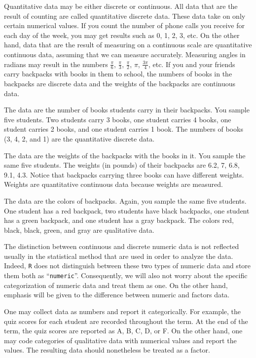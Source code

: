\documentclass[]{krantz}
\theoremstyle{definition}
\theoremstyle{definition}
\theoremstyle{definition}
\theoremstyle{remark}
\begin{document}
Quantitative data may be either discrete or continuous. All data that
are the result of counting are called quantitative discrete data. These
data take on only certain numerical values. If you count the number of
phone calls you receive for each day of the week, you may get results
such as 0, 1, 2, 3, etc. On the other hand, data that are the result of
measuring on a continuous scale are quantitative continuous data,
assuming that we can measure accurately. Measuring angles in radians may
result in the numbers \(\frac{\pi}{6}\), \(\frac{\pi}{3}\),
\(\frac{\pi}{2}\), \(\pi\), \(\frac{3\pi}{4}\), etc. If you and your
friends carry backpacks with books in them to school, the numbers of
books in the backpacks are discrete data and the weights of the
backpacks are continuous data.

The data are the number of books students carry in their backpacks. You
sample five students. Two students carry 3 books, one student carries 4
books, one student carries 2 books, and one student carries 1 book. The
numbers of books (3, 4, 2, and 1) are the quantitative discrete data.

The data are the weights of the backpacks with the books in it. You
sample the same five students. The weights (in pounds) of their
backpacks are 6.2, 7, 6.8, 9.1, 4.3. Notice that backpacks carrying
three books can have different weights. Weights are quantitative
continuous data because weights are measured.

The data are the colors of backpacks. Again, you sample the same five
students. One student has a red backpack, two students have black
backpacks, one student has a green backpack, and one student has a gray
backpack. The colors red, black, black, green, and gray are qualitative
data.

The distinction between continuous and discrete numeric data is not
reflected usually in the statistical method that are used in order to
analyze the data. Indeed, \texttt{R} does not distinguish between these
two types of numeric data and store them both as ``\texttt{numeric}''.
Consequently, we will also not worry about the specific categorization
of numeric data and treat them as one. On the other hand, emphasis will
be given to the difference between numeric and factors data.

One may collect data as numbers and report it categorically. For
example, the quiz scores for each student are recorded throughout the
term. At the end of the term, the quiz scores are reported as A, B, C,
D, or F. On the other hand, one may code categories of qualitative data
with numerical values and report the values. The resulting data should
nonetheless be treated as a factor.
\end{document}
